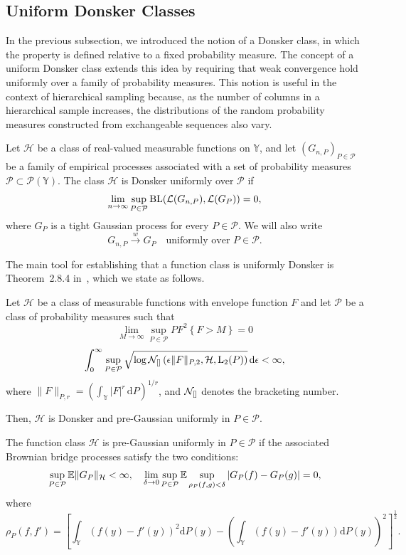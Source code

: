 \subsection{Uniform Donsker Classes}
In the previous subsection, we introduced the notion of a Donsker class, in which the property is defined relative to a fixed probability measure. The concept of a uniform Donsker class extends this idea by requiring that weak convergence hold uniformly over a family of probability measures. This notion is useful in the context of hierarchical sampling because, as the number of columns in a hierarchical sample increases, the distributions of the random probability measures constructed from exchangeable sequences also vary.
\begin{definition}\label{definition::donsker_uniform}
Let $\mathcal{H}$ be a class of real-valued measurable functions on $\mathbb{Y}$, and let $(G_{n,P})_{P \in \mathcal{P}}$ be a family of empirical processes associated with a set of probability measures $\mathcal{P} \subset \mathcal{P}(\mathbb{Y})$. The class $\mathcal{H}$ is Donsker uniformly over $\mathcal{P}$ if
\[
\lim_{n \to \infty} \sup_{P \in \mathcal{P}}
\mathrm{BL}\!\left( \mathcal{L}(G_{n,P}), \mathcal{L}(G_P) \right) = 0,
\]
where $G_P$ is a tight Gaussian process for every $P \in \mathcal{P}$. We will also write
\[
G_{n,P} \overset{w}{\to} G_P \quad \text{uniformly over } P \in \mathcal{P}.
\]
\end{definition} 
The main tool for establishing that a function class is uniformly Donsker is Theorem~2.8.4 in~\cite{van1996weak}, which we state as follows.
\begin{theorem}\label{theorem::uniform_donsker}
Let $\mathcal{H}$ be a class of measurable functions with envelope function $F$ and let $\mathcal{P}$ be a class of probability measures such that
\[
\lim_{M\to \infty} \sup_{P \in \mathcal{P}} PF^2\left\{ F > M \right\} = 0
\]
\[
\int_0^\infty \sup_{P \in \mathcal{P}}\sqrt{\log \mathcal{N}_{[]}\left(\epsilon \|F\|_{P,2}, \mathcal{H}, \mathrm{L}_2(P) \right)}\,\mathrm{d}\epsilon < \infty,
\]
where $\|F\|_{P,r} = \left(\int_{\mathbb{Y}}|F|^r\, \mathrm{d}P\right)^{1/r}$, and $\mathcal{N}_{[]}$ denotes the bracketing number.

Then, $\mathcal{H}$ is Donsker and pre-Gaussian uniformly in $P \in \mathcal{P}$.    
\end{theorem}
\begin{definition}\label{definition::pre_gaussian}
The function class $\mathcal{H}$ is pre-Gaussian uniformly in $P \in \mathcal{P}$ if the associated Brownian bridge processes satisfy the two conditions:
\[
\sup_{P \in \mathcal{P}} \mathbb{E} \| G_P \|_\mathcal{H} < \infty, \quad \lim_{\delta \to 0}\sup_{P \in \mathcal{P}} \mathbb{E} \sup_{\rho_P\left(f,g\right)<\delta} \left|G_P(f)-G_P(g) \right| = 0,
\]
where 
\[
\rho_P(f,f') = \left[ \int_{\mathbb{Y}} \left(f(y) -f'(y) \right)^2 \mathrm{d}P(y) - \left(\int_{\mathbb{Y}}\left(f(y) - f'(y) \right)\mathrm{d}P(y) \right)^2 \right]^{\frac{1}{2}}.
\]
\end{definition}
